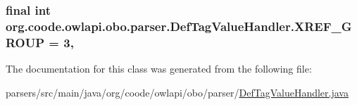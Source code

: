 \hypertarget{classorg_1_1coode_1_1owlapi_1_1obo_1_1parser_1_1_def_tag_value_handler_a486dda4237f394c99628e5a2b1efd7b1}{
\subsubsection[{X\-R\-E\-F\-\_\-\-G\-R\-O\-U\-P}]{\setlength{\rightskip}{0pt plus 5cm}final int org.\-coode.\-owlapi.\-obo.\-parser.\-Def\-Tag\-Value\-Handler.\-X\-R\-E\-F\-\_\-\-G\-R\-O\-U\-P = 3\hspace{0.3cm}{\ttfamily [static]}, {\ttfamily [private]}}}\label{classorg_1_1coode_1_1owlapi_1_1obo_1_1parser_1_1_def_tag_value_handler_a486dda4237f394c99628e5a2b1efd7b1}


The documentation for this class was generated from the following file\-:\begin{DoxyCompactItemize}
\item 
parsers/src/main/java/org/coode/owlapi/obo/parser/\hyperlink{_def_tag_value_handler_8java}{Def\-Tag\-Value\-Handler.\-java}\end{DoxyCompactItemize}
